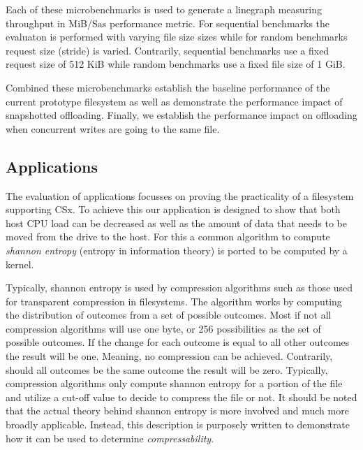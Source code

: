 Each of these microbenchmarks is used to generate a linegraph measuring
throughput in MiB/S\footnotemark[16] as performance metric. For sequential
benchmarks the evaluaton is performed with varying file size sizes while for
random benchmarks request size (stride) is varied. Contrarily, sequential
benchmarks use a fixed request size of 512 KiB while random benchmarks use a
fixed file size of 1 GiB.


Combined these microbenchmarks establish the baseline performance of the current
prototype filesystem as well as demonstrate the performance impact of
snapshotted offloading. Finally, we establish the performance impact on
offloading when concurrent writes are going to the same file.

\subsection{Applications}

The evaluation of applications focusses on proving the practicality of a 
filesystem supporting CSx. To achieve this our application is designed to show
that both host CPU load can be decreased as well as the amount of data that
needs to be moved from the drive to the host. For this a common algorithm to
compute \textit{shannon entropy} (entropy in information theory) \cite{6773024}
is ported to be computed by a kernel.

Typically, shannon entropy is used by compression algorithms such as those used
for transparent compression in filesystems. The algorithm works by computing
the distribution of outcomes from a set of possible outcomes. Most if not all
compression algorithms will use one byte, or 256 possibilities as the set of
possible outcomes. If the change for each outcome is equal to all other
outcomes the result will be one\footnotemark[17]. Meaning, no compression can be
achieved. Contrarily, should all outcomes be the same outcome the result will
be zero. Typically, compression algorithms only compute shannon entropy for a
portion of the file and utilize a cut-off value to decide to compress the file
or not. It should be noted that the actual theory behind shannon entropy is more
involved and much more broadly applicable. Instead, this description is
purposely written to demonstrate how it can be used to determine
\textit{compressability}.

